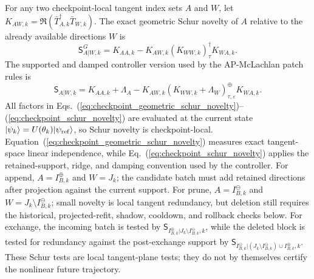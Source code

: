 \documentclass[
  reprint,
  amsmath,
  amssymb,
  aps,
  pra,
  nofootinbib,
  superscriptaddress,
  floatfix
]{revtex4-2}
\newcommand{\eps}{\varepsilon}
\newcommand{\ket}[1]{|#1\rangle}
\begin{document}
For any two checkpoint-local tangent index sets $A$ and $W$, let $K_{AW,k}=\Re(\bar T_{A,k}^{\dagger}\bar T_{W,k})$.  The exact geometric Schur novelty of $A$ relative to the already available directions \(W\) is
\begin{equation}
\mathsf S^G_{A|W,k}
=
K_{AA,k}
-
K_{AW,k}(K_{WW,k})_{\tau}^{\dagger}K_{WA,k}.
\label{eq:checkpoint_geometric_schur_novelty}
\end{equation}
The supported and damped controller version used by the AP-McLachlan patch
rules is
\begin{equation}
\mathsf S_{A|W,k}
=
K_{AA,k}+\Lambda_A
-
K_{AW,k}(K_{WW,k}+\Lambda_W)_{\tau,\eps}^{\oplus}K_{WA,k}.
\label{eq:checkpoint_schur_novelty}
\end{equation}
All factors in Eqs.~(\ref{eq:checkpoint_geometric_schur_novelty})--(\ref{eq:checkpoint_schur_novelty}) are evaluated at the current state $\ket{\psi_k}=U(\theta_k)\ket{\psi_{\rm ref}}$, so Schur novelty is checkpoint-local.  Equation~(\ref{eq:checkpoint_geometric_schur_novelty}) measures exact tangent-space linear independence, while Eq.~(\ref{eq:checkpoint_schur_novelty}) applies the retained-support, ridge, and damping convention used by the controller.  For append, $A=I_{B,k}^{\oplus}$ and $W=J_k$; the candidate batch must add retained directions after projection against the current support.  For prune, $A=I_{B,k}^{\ominus}$ and $W=J_k\setminus I_{B,k}^{\ominus}$; small novelty is local tangent redundancy, but deletion still requires the historical, projected-refit, shadow, cooldown, and rollback checks below.  For exchange, the incoming batch is tested by $\mathsf S_{I_{B,k}^{\oplus}|J_k\setminus I_{B,k}^{\ominus},k}$, while the deleted block is tested for redundancy against the post-exchange support by $\mathsf S_{I_{B,k}^{\ominus}|(J_k\setminus I_{B,k}^{\ominus})\cup I_{B,k}^{\oplus},k}$.  These Schur tests are local tangent-plane tests; they do not by themselves certify the nonlinear future trajectory.
\end{document}
